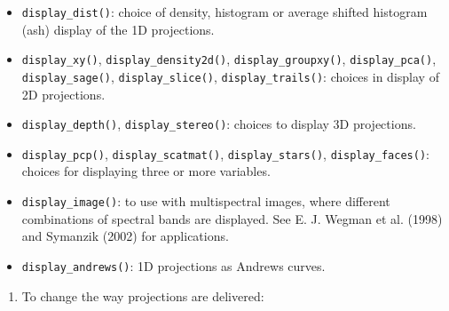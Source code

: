 \documentclass[
  letterpaper,
]{krantz}
\providecommand{\tightlist}{%
  \setlength{\itemsep}{0pt}\setlength{\parskip}{0pt}}\usepackage{longtable,booktabs,array}
\begin{document}
\begin{itemize}
\tightlist
\item
  \texttt{display\_dist()}: choice of density, histogram or average
  shifted histogram (ash) display of the 1D projections.
\item
  \texttt{display\_xy()}, \texttt{display\_density2d()},
  \texttt{display\_groupxy()}, \texttt{display\_pca()},
  \texttt{display\_sage()}, \texttt{display\_slice()},
  \texttt{display\_trails()}: choices in display of 2D projections.
\item
  \texttt{display\_depth()}, \texttt{display\_stereo()}: choices to
  display 3D projections.
\item
  \texttt{display\_pcp()}, \texttt{display\_scatmat()},
  \texttt{display\_stars()}, \texttt{display\_faces()}: choices for
  displaying three or more variables.
\item
  \texttt{display\_image()}: to use with multispectral images, where
  different combinations of spectral bands are displayed. See E. J.
  Wegman et al. (1998) and Symanzik (2002) for applications.
\item
  \texttt{display\_andrews()}: 1D projections as Andrews curves.
\end{itemize}

\begin{enumerate}
\def\labelenumi{\arabic{enumi}.}
\setcounter{enumi}{1}
\tightlist
\item
  To change the way projections are delivered:
\end{enumerate}
\end{document}

